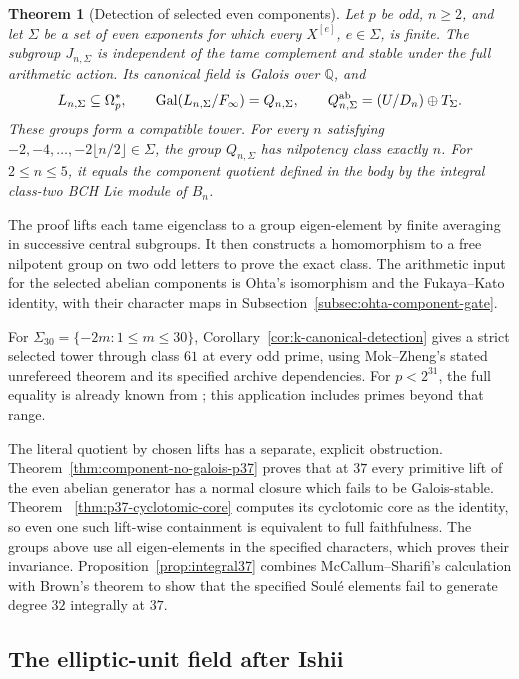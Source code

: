 \documentclass[11pt]{article}
\newtheorem{theorem}{Theorem}[section]
\theoremstyle{definition}\newtheorem{definition}[theorem]{Definition}
\begin{document}
\begin{theorem}[Detection of selected even components]
\label{thm:selected-all-stages}
Let \(p\) be odd, \(n\geq2\), and let \(\Sigma\) be a set of
even exponents for which every \(X^{[e]}\), \(e\in\Sigma\), is finite.
The subgroup \(J_{n,\Sigma}\) is independent of the tame complement
and stable under the full arithmetic action. Its canonical field is
Galois over \(\mathbb Q\), and
\[
 L_{n,\Sigma}\subseteq\Omega_p^*,\qquad
 \operatorname{Gal}(L_{n,\Sigma}/F_\infty)=Q_{n,\Sigma},\qquad
 Q_{n,\Sigma}^{\rm ab}=(U/D_n)\oplus T_\Sigma.
\]
These groups form a compatible tower. For every \(n\) satisfying
\(-2,-4,\ldots,-2\lfloor n/2\rfloor\in\Sigma\), the group
\(Q_{n,\Sigma}\) has nilpotency class exactly \(n\).
For \(2\leq n\leq5\), it equals the component quotient defined
in the body by the integral class-two BCH Lie module of \(B_n\).
\end{theorem}
The proof lifts each tame eigenclass to a group eigen-element by
finite averaging in successive central subgroups. It then constructs
a homomorphism to a free nilpotent group on two odd letters to prove
the exact class. The arithmetic input for the selected abelian
components is Ohta's isomorphism and the Fukaya--Kato identity, with
their character maps in Subsection~\ref{subsec:ohta-component-gate}.

For \(\Sigma_{30}=\{-2m:1\leq m\leq30\}\),
Corollary~\ref{cor:k-canonical-detection} gives a strict selected tower
through class \(61\) at every odd prime, using Mok--Zheng's stated
unrefereed theorem and its specified archive dependencies.
For \(p<2^{31}\), the full equality is already known from
\cite{Note,HHO}; this application includes primes beyond that range.

The literal quotient by chosen lifts has a separate, explicit
obstruction. Theorem~\ref{thm:component-no-galois-p37} proves that at
\(37\) every primitive lift of the even abelian generator has a
normal closure which fails to be Galois-stable. Theorem~
\ref{thm:p37-cyclotomic-core} computes its cyclotomic core as the
identity, so even one such lift-wise containment is equivalent to
full faithfulness. The groups above use all eigen-elements in the
specified characters, which proves their invariance.
Proposition~\ref{prop:integral37} combines McCallum--Sharifi's
calculation with Brown's theorem to show that the specified Soul\'e
elements fail to generate degree \(32\) integrally at \(37\).

\subsection{The elliptic-unit field after Ishii}
\end{document}
